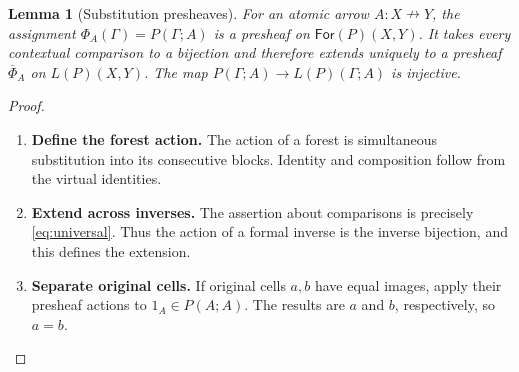\documentclass[11pt,reqno]{amsart}
\theoremstyle{plain}
\newtheorem{lemma}[theorem]{Lemma}
\theoremstyle{definition}
\theoremstyle{remark}
\numberwithin{equation}{section}
\newcommand{\harr}{\mathrel{\nrightarrow}}
\newcommand{\Forest}{\mathsf{For}}
\begin{document}
\begin{lemma}[Substitution presheaves]\label{lem:presheaf}
For an atomic arrow $A:X\harr Y$, the assignment
$\Phi_A(\Gamma)=P(\Gamma;A)$ is a presheaf on $\Forest(P)(X,Y)$.
It takes every contextual comparison to a bijection and therefore extends
uniquely to a presheaf $\overline\Phi_A$ on $L(P)(X,Y)$.
The map $P(\Gamma;A)\to L(P)(\Gamma;A)$ is injective.
\end{lemma}
\begin{proof}\leavevmode
\begin{enumerate}
\item \textbf{Define the forest action.} The action of a forest is simultaneous substitution into its consecutive
blocks. Identity and composition follow from the virtual identities.

\item \textbf{Extend across inverses.} The assertion about comparisons is precisely \cref{eq:universal}.
Thus the action of a formal inverse is the inverse bijection, and this
defines the extension.

\item \textbf{Separate original cells.} If original cells $a,b$ have equal images, apply
their presheaf actions to $1_A\in P(A;A)$. The results are $a$ and $b$,
respectively, so $a=b$.\qedhere
\end{enumerate}
\end{proof}
\end{document}
